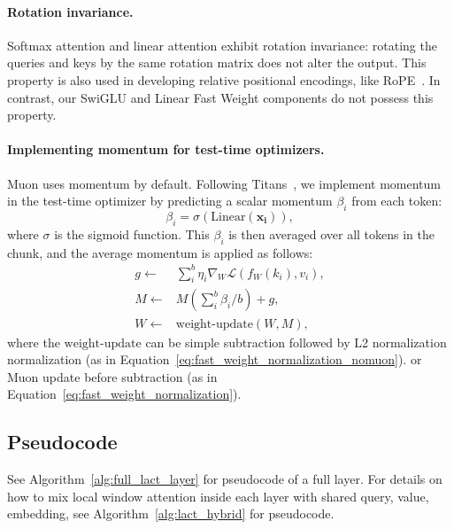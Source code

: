 \paragraph{Rotation invariance.} Softmax attention and linear attention exhibit rotation invariance: rotating the queries and keys by the same rotation matrix does not alter the output. This property is also used in developing relative positional encodings, like RoPE~\cite{su2023roformer}. In contrast, our SwiGLU and Linear Fast Weight components do not possess this property.


\paragraph{Implementing momentum for test-time optimizers.}  \label{paragraph:momentum}
Muon uses momentum by default. Following Titans~\cite{behrouz2024titans}, we implement momentum in the test-time optimizer by predicting a scalar momentum $\beta_i$ from each token: 
\begin{equation}
    \beta_i = \sigma(\text{Linear}(\boldsymbol{x_i})), 
\end{equation}
where $\sigma$ is the sigmoid function.  This $\beta_i$ is then averaged over all tokens in the chunk, and the average momentum is applied as follows:
\begin{equation}
\begin{aligned}
    g \leftarrow&  \sum_i^b \eta_i \nabla_W \mathcal{L}(f_W(k_i), v_i), \\
    M \leftarrow&  M (\sum_i^b \beta_i / b) + g, \\
    W \leftarrow& \text{weight-update}(W, M),
\end{aligned}
\end{equation}
where the $\text{weight-update}$ can be simple subtraction followed by L2 normalization normalization (as in Equation~\ref{eq:fast_weight_normalization_nomuon}). or Muon update before subtraction (as in Equation~\ref{eq:fast_weight_normalization}).


\subsection{Pseudocode}
\label{sec:ttt_pseudocode}


See Algorithm~\ref{alg:full_lact_layer} for pseudocode of a full \methodname{} layer. 
For details on how to mix local window attention inside each layer with shared query, value, embedding, see Algorithm~\ref{alg:lact_hybrid} for pseudocode. 





